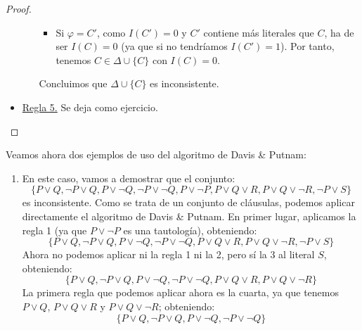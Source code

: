\begin{teo}
\begin{proof}
\begin{itemize}
\begin{itemize}
\begin{itemize}
                            \item Si $\varphi=C'$, como $I(C')=0$ y $C'$ contiene más literales que $C$, ha de ser $I(C) =0$ (ya que si no tendríamos $I(C')=1$). Por tanto, tenemos $C \in \Delta\cup\{C\}$ con $I(C)=0$.
                        \end{itemize}
                        Concluimos que $\Delta\cup\{C\}$ es inconsistente.
                \end{itemize}
            \item \underline{Regla 5.} Se deja como ejercicio.
        \end{itemize}
    \end{proof}
\end{teo}

\begin{ejemplo}
    Veamos ahora dos ejemplos de uso del algoritmo de Davis \& Putnam:
    \begin{enumerate}
        \item En este caso, vamos a demostrar que el conjunto:
            \begin{equation*}
                \{P\lor Q, \lnot P\lor Q, P\lor \lnot Q, \lnot P\lor \lnot Q, P \lor \lnot P, P \lor Q \lor R, P \lor Q \lor \lnot R, \lnot P \lor S\}
            \end{equation*}
            es inconsistente. Como se trata de un conjunto de cláusulas, podemos aplicar directamente el algoritmo de Davis \& Putnam. En primer lugar, aplicamos la regla 1 (ya que $P\lor \lnot P$ es una tautología), obteniendo:
            \begin{equation*}
                \{P\lor Q, \lnot P\lor Q, P\lor \lnot Q, \lnot P\lor \lnot Q, P \lor Q \lor R, P \lor Q \lor \lnot R, \lnot P \lor S\}
            \end{equation*}
            Ahora no podemos aplicar ni la regla 1 ni la 2, pero sí la 3 al literal $S$, obteniendo:
            \begin{equation*}
                \{P\lor Q, \lnot P\lor Q, P\lor \lnot Q, \lnot P\lor \lnot Q, P \lor Q \lor R, P \lor Q \lor \lnot R\}
            \end{equation*}
            La primera regla que podemos aplicar ahora es la cuarta, ya que tenemos $P\lor Q$, $P\lor Q\lor R$ y $P\lor Q\lor \lnot R$; obteniendo:
            \begin{equation*}
                \{P\lor Q, \lnot P\lor Q, P\lor \lnot Q, \lnot P \lor \lnot Q\}
            \end{equation*}

\end{enumerate}
\end{ejemplo}
